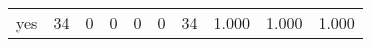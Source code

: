 \begin{longtable}{lp{2.0cm}p{2.0cm}p{2.0cm}p{2.0cm}p{2.0cm}p{2.0cm}p{2.0cm}p{2.0cm}p{2.0cm}}
yes       &                     34 &                                             0 &                                            0 &                                           0 &                                            0 &                                         34 &                                1.000 &                                  1.000 &                                1.000 \\
\end{longtable}
